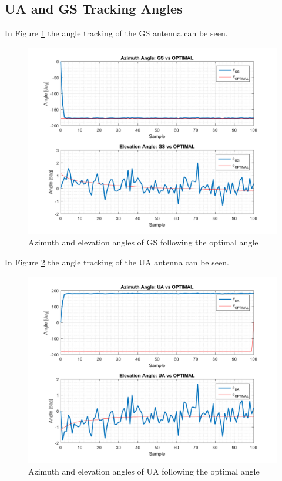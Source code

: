 \subsection*{UA and GS Tracking Angles}
In Figure \ref{fig:s2_gs} the angle tracking of the GS antenna can be seen.

\begin{figure}[H]
	\centering
	\includegraphics[scale=0.8]{figures/s2_gs.png}
	\caption{Azimuth and elevation angles of GS following the optimal angle}
	\label{fig:s2_gs}
\end{figure}

In Figure \ref{fig:s2_ua} the angle tracking of the UA antenna can be seen.

\begin{figure}[H]
	\centering
	\includegraphics[scale=0.8]{figures/s2_ua.png}
	\caption{Azimuth and elevation angles of UA following the optimal angle}
	\label{fig:s2_ua}
\end{figure}


